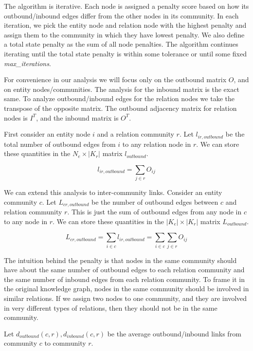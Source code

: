 \documentclass[12pt]{article}
\begin{document}
\newpage

The algorithm is iterative. Each node is assigned a penalty score based on how
its outbound/inbound edges differ from the other nodes in its community. In each
iteration, we pick the entity node and relation node with the highest penalty
and assign them to the community in which they have lowest penalty. We also
define a total state penalty as the sum of all node penalties. The algorithm
continues iterating until the total state penalty is within some tolerance or
until some fixed \textit{max\_iterations}.

For convenience in our analysis we will focus only on the outbound matrix $O$,
and on entity nodes/communities. The analysis for the inbound matrix is the
exact same. To analyze outbound/inbound edges for the relation nodes we take the
transpose of the opposite matrix. The outbound adjacency matrix for relation
nodes is $I^T$, and the inbound matrix is $O^T$.

First consider an entity node $i$ and a relation community $r$. Let
$l_{ir,outbound}$ be the total number of outbound edges from $i$ to any relation
node in $r$. We can store these quantities in the $N_e\times |K_r|$ matrix
$l_{outbound}$.

$$l_{ir, outbound} = \sum_{j \in r} O_{ij}$$

\newpage

We can extend this analysis to inter-community links. Consider an entity
community $c$. Let $L_{cr,outbound}$ be the number of outbound edges between $c$
and relation community $r$. This is just the sum of outbound edges from any node
in $c$ to any node in $r$. We can store these quantities in the $|K_e|\times
|K_r|$ matrix $L_{outbound}$.

$$L_{cr, outbound} = \sum_{i \in c} l_{ir, outbound} = \sum_{i \in c} \sum_{j \in r} O_{ij} $$

The intuition behind the penalty is that nodes in the same community should have
about the same number of outbound edges to each relation community and the same
number of inbound edges from each relation community. To frame it in the original
knowledge graph, nodes in the same community should be involved in similar relations.
If we assign two nodes to one community, and they are involved in very different
types of relations, then they should not be in the same community.

Let $d_{outbound}(c,r), d_{inbound}(c,r)$ be the average outbound/inbound links
from community $c$ to community $r$.
\end{document}
